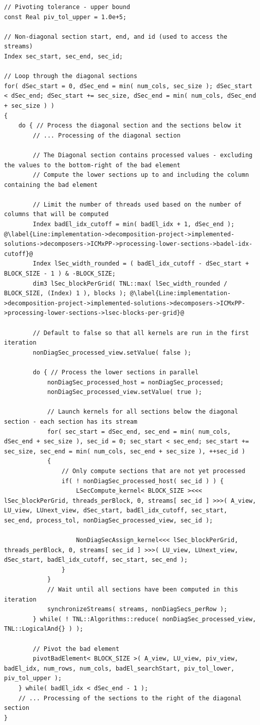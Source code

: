 \begin{lstlisting}
// Pivoting tolerance - upper bound
const Real piv_tol_upper = 1.0e+5;

// Non-diagonal section start, end, and id (used to access the streams)
Index sec_start, sec_end, sec_id;

// Loop through the diagonal sections
for( dSec_start = 0, dSec_end = min( num_cols, sec_size ); dSec_start < dSec_end; dSec_start += sec_size, dSec_end = min( num_cols, dSec_end + sec_size ) )
{	
	do { // Process the diagonal section and the sections below it
		// ... Processing of the diagonal section
		
		// The Diagonal section contains processed values - excluding the values to the bottom-right of the bad element
		// Compute the lower sections up to and including the column containing the bad element
		
		// Limit the number of threads used based on the number of columns that will be computed
		Index badEl_idx_cutoff = min( badEl_idx + 1, dSec_end ); @\label{Line:implementation->decomposition-project->implemented-solutions->decomposers->ICMxPP->processing-lower-sections->badel-idx-cutoff}@
		Index lSec_width_rounded = ( badEl_idx_cutoff - dSec_start + BLOCK_SIZE - 1 ) & -BLOCK_SIZE;
		dim3 lSec_blockPerGrid( TNL::max( lSec_width_rounded / BLOCK_SIZE, (Index) 1 ), blocks ); @\label{Line:implementation->decomposition-project->implemented-solutions->decomposers->ICMxPP->processing-lower-sections->lsec-blocks-per-grid}@
		
		// Default to false so that all kernels are run in the first iteration
		nonDiagSec_processed_view.setValue( false );
		
		do { // Process the lower sections in parallel
			nonDiagSec_processed_host = nonDiagSec_processed;
			nonDiagSec_processed_view.setValue( true );
			
			// Launch kernels for all sections below the diagonal section - each section has its stream
			for( sec_start = dSec_end, sec_end = min( num_cols, dSec_end + sec_size ), sec_id = 0; sec_start < sec_end; sec_start += sec_size, sec_end = min( num_cols, sec_end + sec_size ), ++sec_id )
			{
				// Only compute sections that are not yet processed
				if( ! nonDiagSec_processed_host( sec_id ) ) {
					LSecCompute_kernel< BLOCK_SIZE ><<< lSec_blockPerGrid, threads_perBlock, 0, streams[ sec_id ] >>>( A_view, LU_view, LUnext_view, dSec_start, badEl_idx_cutoff, sec_start, sec_end, process_tol, nonDiagSec_processed_view, sec_id );
					
					NonDiagSecAssign_kernel<<< lSec_blockPerGrid, threads_perBlock, 0, streams[ sec_id ] >>>( LU_view, LUnext_view, dSec_start, badEl_idx_cutoff, sec_start, sec_end );
				}
			}
			// Wait until all sections have been computed in this iteration
			synchronizeStreams( streams, nonDiagSecs_perRow );
		} while( ! TNL::Algorithms::reduce( nonDiagSec_processed_view, TNL::LogicalAnd{} ) );
		
		// Pivot the bad element
		pivotBadElement< BLOCK_SIZE >( A_view, LU_view, piv_view, badEl_idx, num_rows, num_cols, badEl_searchStart, piv_tol_lower, piv_tol_upper );
	} while( badEl_idx < dSec_end - 1 );
	// ... Processing of the sections to the right of the diagonal section
}
\end{lstlisting}

